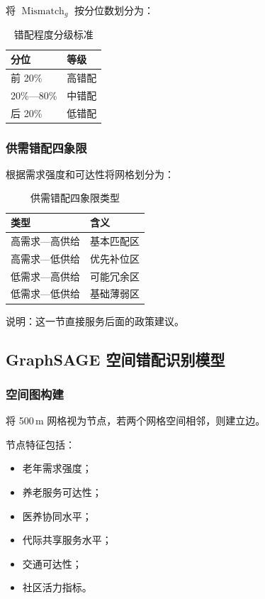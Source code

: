\documentclass[UTF8,zihao=-4,a4paper,fontset=none]{ctexart}
\begin{document}
将 $\operatorname{Mismatch}_g$ 按分位数划分为：

\begin{table}[H]
\centering
\caption{错配程度分级标准}
\begin{tabular}{ll}
\toprule
\rowcolor{tablehead}
分位 & 等级 \\
\midrule
前 20\% & 高错配 \\
20\%—80\% & 中错配 \\
后 20\% & 低错配 \\
\bottomrule
\end{tabular}
\end{table}

\subsubsection{供需错配四象限}

根据需求强度和可达性将网格划分为：

\begin{table}[H]
\centering
\caption{供需错配四象限类型}
\begin{tabular}{ll}
\toprule
\rowcolor{tablehead}
类型 & 含义 \\
\midrule
高需求—高供给 & 基本匹配区 \\
高需求—低供给 & 优先补位区 \\
低需求—高供给 & 可能冗余区 \\
低需求—低供给 & 基础薄弱区 \\
\bottomrule
\end{tabular}
\end{table}

说明：这一节直接服务后面的政策建议。

\subsection{GraphSAGE 空间错配识别模型}

\subsubsection{空间图构建}

将 500\,m 网格视为节点，若两个网格空间相邻，则建立边。

节点特征包括：

\begin{itemize}
\item 老年需求强度；
\item 养老服务可达性；
\item 医养协同水平；
\item 代际共享服务水平；
\item 交通可达性；
\item 社区活力指标。
\end{itemize}
\end{document}

